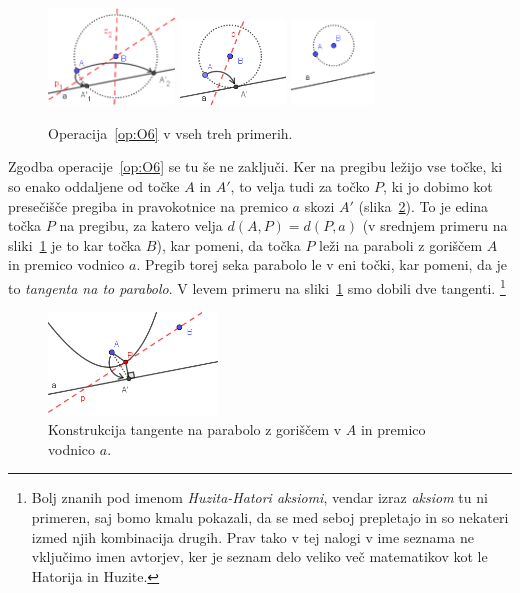 \begin{figure}[h]
    \centering
    \includegraphics[width=0.3\textwidth]{images/origami_operacije/O6a.png}
    \includegraphics[width=0.25\textwidth]{images/origami_operacije/O6b.png}
    \includegraphics[width=0.2\textwidth]{images/origami_operacije/O6c.png}
    \caption[Operacija~\ref{op:O6}]{Operacija~\ref{op:O6} v vseh treh primerih.}
    \label{fig:O6}
\end{figure}

Zgodba operacije~\ref{op:O6} se tu še ne zaključi. Ker na pregibu ležijo vse točke, ki so enako oddaljene od točke $A$ in $A'$, to velja tudi za točko $P$, ki jo dobimo kot presečišče pregiba in pravokotnice na premico $a$ skozi $A'$ (slika~\ref{fig:O6_parabola}). To je edina točka $P$ na pregibu, za katero velja $ d(A,P) = d(P,a) $ (v srednjem primeru na sliki~\ref{fig:O6} je to kar točka $B$), kar pomeni, da točka $P$ leži na paraboli z goriščem $A$ in premico vodnico $a$. Pregib torej seka parabolo le v eni točki, kar pomeni, da je to \emph{tangenta na to parabolo}. V levem primeru na sliki~\ref{fig:O6} smo dobili dve tangenti.
\footnote{Bolj znanih pod imenom \emph{Huzita-Hatori aksiomi}, vendar izraz \emph{aksiom} tu ni primeren, saj bomo kmalu pokazali, da se med seboj prepletajo in so nekateri izmed njih kombinacija drugih. Prav tako v tej nalogi v ime seznama ne vključimo imen avtorjev, ker je seznam delo veliko več matematikov kot le Hatorija in Huzite.}
\begin{figure}[h]
    \centering
    \includegraphics[width=0.4\textwidth]{images/origami_operacije/O6_parabola.png}
    \caption[Tangenta na parabolo]{Konstrukcija tangente na parabolo z goriščem v $A$ in premico vodnico $a$.}
    \label{fig:O6_parabola}
\end{figure}

